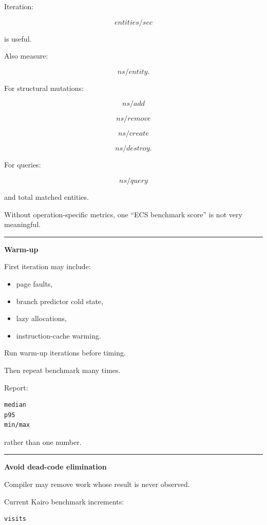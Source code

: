 Iteration:

\[
entities/sec
\]

is useful.

Also measure:

\[
ns/entity.
\]

For structural mutations:

\[
ns/add
\]

\[
ns/remove
\]

\[
ns/create
\]

\[
ns/destroy.
\]

For queries:

\[
ns/query
\]

and total matched entities.

Without operation-specific metrics, one ``ECS benchmark score'' is not very meaningful.

\begin{center}\rule{0.5\linewidth}{0.5pt}\end{center}

\textbf{Warm-up}

First iteration may include:

\begin{itemize}
\tightlist
\item
  page faults,
\item
  branch predictor cold state,
\item
  lazy allocations,
\item
  instruction-cache warming.
\end{itemize}

Run warm-up iterations before timing.

Then repeat benchmark many times.

Report:

\begin{verbatim}
median
p95
min/max
\end{verbatim}

rather than one number.

\begin{center}\rule{0.5\linewidth}{0.5pt}\end{center}

\textbf{Avoid dead-code elimination}

Compiler may remove work whose result is never observed.

Current Kairo benchmark increments:

\begin{verbatim}
visits
\end{verbatim}

